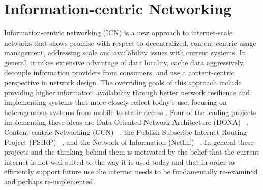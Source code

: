 \section{Information-centric Networking}
\label{section:information-centric-networking}
Information-centric networking (ICN) is a new approach to internet-scale networks that shows promise with respect to decentralized, content-centric usage management, addressing scale and availability issues with current systems.  In general, it takes extensive advantage of data locality, cache data aggressively, decouple information providers from consumers, and use a content-centric perspective in network design. The overriding goals of this approach include providing higher information availability through better network resilience and implementing systems that more closely reflect today's use, focusing on heterogeneous systems from mobile to static access \cite{6231276}.  Four of the leading projects implementing these ideas are Data-Oriented Network Architecture (DONA) ~\cite{Koponen:2007:DNA:1282427.1282402}, Content-centric Networking (CCN) ~\cite{NDN,CCNx}, the Publish-Subscribe Internet Routing Project (PSIRP) ~\cite{PSIRP}, and the Network of Information (NetInf) ~\cite{NetInf}.  In general these projects and the thinking behind them is motivated by the belief that the current internet is not well suited to the way it is used today and that in order to efficiently support future use the internet needs to be fundamentally re-examined and perhaps re-implemented.

